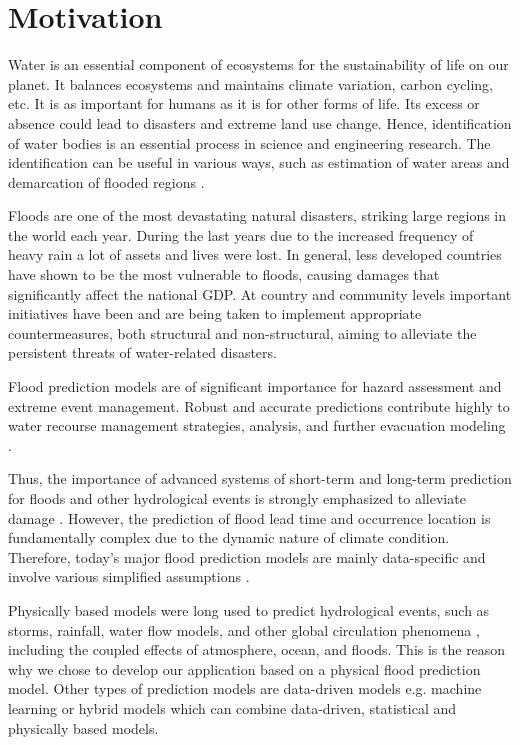 \documentclass[12pt, a4paper]{report}
\begin{document}
\section{Motivation}
\quad
Water is an essential component of ecosystems for the sustainability of life on our planet. It balances ecosystems and maintains climate variation, carbon cycling, etc. It is as important for humans as it is for other forms of life. Its excess or absence could lead to disasters and extreme land use change. Hence, identification of water bodies is an essential process in science and engineering research. The identification can be useful in various ways, such as estimation of water areas and demarcation of flooded regions \cite {Rover, Alsdorf}.
\par 

Floods are one of the most devastating natural disasters, striking large regions in the world each year. During the last years due to the increased frequency of heavy rain a lot of assets and lives were lost. In general, less developed countries have shown to be the most vulnerable to floods, causing damages that significantly affect the national GDP. At country and community levels important initiatives have been and are being taken to implement appropriate countermeasures, both structural and non-structural, aiming to alleviate the persistent threats of water-related disasters. \cite{Flood-forecasting} 
\par

Flood prediction models are of significant importance for hazard assessment and extreme event management. Robust and accurate predictions contribute highly to water recourse management strategies, analysis, and further evacuation modeling \cite{Xie}.
\par

Thus, the importance of advanced systems of short-term and long-term prediction for floods and other hydrological events is strongly emphasized to alleviate damage \cite{Pitt}. However, the prediction of flood lead time and occurrence location is fundamentally complex due to the dynamic nature of climate condition. Therefore, today’s major flood prediction models are mainly data-specific and involve various simplified assumptions \cite{Lohani}. 
\par

Physically based models were long used to predict hydrological events, such as storms, rainfall, water flow models, and other global circulation phenomena , including the coupled effects of atmosphere, ocean, and floods. This is the reason why we chose to develop our application based on a physical flood prediction model. Other types of prediction models are data-driven models e.g. machine learning or hybrid models which can combine data-driven, statistical and physically based models.
\par 
\end{document}
